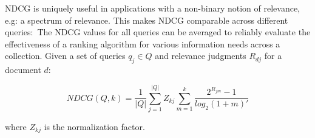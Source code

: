 NDCG is uniquely useful in applications with a non-binary notion of relevance, e.g: a spectrum of relevance.
This makes NDCG comparable across different queries:\
The NDCG values for all queries can be averaged to reliably evaluate the effectiveness of a ranking algorithm for various information needs across a collection.
Given a set of queries $ q_j \in Q $ and relevance judgments $ R_{dj} $ for a document $ d $:\

\begin{equation}
NDCG(Q, k) = \frac{1}{|Q|} \sum ^{|Q|} _{j = 1} Z_{kj} \sum ^k _{m = 1} \frac{2^{R_{jm}} - 1}{log_2 (1 + m)'}
\end{equation}

\noindent where $ Z_{kj} $ is the normalization factor.